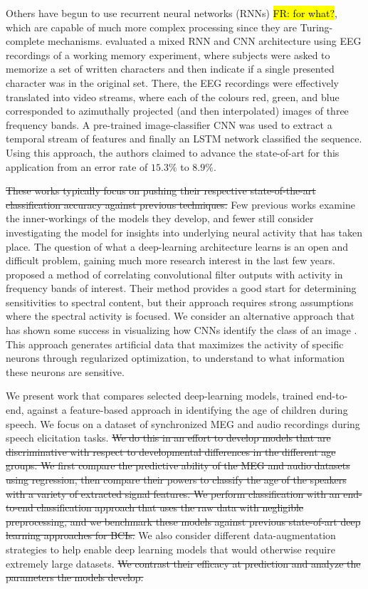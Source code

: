 \documentclass[utf8]{frontiersSCNS} %
\newcommand{\FR}[1]{{\small \textcolor{red}{\hl{FR: #1}}}}
\begin{document}
Others have begun to use recurrent neural networks (RNNs) \cite{Bashivan2016} \FR{for what?}, which are capable of much more complex processing since they are Turing-complete mechanisms. \cite{Bashivan2016} evaluated a mixed RNN and CNN architecture using EEG recordings of a working memory experiment, where subjects were asked to memorize a set of written characters and then indicate if a single presented character was in the original set. There, the EEG recordings were effectively translated into video streams, where each of the colours red, green, and blue corresponded to azimuthally projected (and then interpolated) images of three frequency bands. A pre-trained image-classifier CNN was used to extract a temporal stream of features and finally an LSTM network classified the sequence. Using this approach, the authors claimed to advance the state-of-art for this application from an error rate of $15.3\%$ to $8.9\%$.

\st{These works typically focus on pushing their respective state-of-the-art classification accuracy against previous techniques.} Few previous works examine the inner-workings of the models they develop, and fewer still consider investigating the model for insights into underlying neural activity that has taken place. The question of what a deep-learning architecture learns is an open and difficult problem, gaining much more research interest in the last few years. \cite{Schirrmeister2017} proposed a method of correlating convolutional filter outputs with activity in frequency bands of interest. Their method provides a good start for determining sensitivities to spectral content, but their approach requires strong assumptions where the spectral activity is focused. We consider an alternative approach that has shown some success in visualizing how CNNs identify the class of an image \cite{Yosinski2015}. This approach generates artificial data that maximizes the activity of specific neurons through regularized optimization, to understand to what information these neurons are sensitive. %

We present work that compares selected deep-learning models, trained end-to-end, against a feature-based approach in identifying the age of children during speech. We focus on a dataset of synchronized MEG and audio recordings during speech elicitation tasks. \st{We do this in an effort to develop models that are discriminative with respect to developmental differences in the different age groups. We first compare the predictive ability of the MEG and audio datasets using regression, then compare their powers to classify the age of the speakers with a variety of extracted signal features. We perform classification with an end-to-end classification approach that uses the raw data with negligible preprocessing, and we benchmark these models against previous state-of-art deep learning approaches for BCIs.} We also consider different data-augmentation strategies to help enable deep learning models that would otherwise require extremely large datasets. \st{We contrast their efficacy at prediction and analyze the parameters the models develop.}
\end{document}
